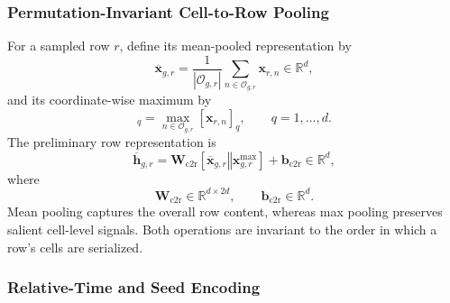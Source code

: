 \documentclass[11pt]{article}
\newcommand{\R}{\mathbb{R}}
\newcommand{\concat}{\mathbin{\Vert}}
\begin{document}
\subsubsection{Permutation-Invariant Cell-to-Row Pooling}
\label{sec:row-pooling}

For a sampled row \(r\), define its mean-pooled representation by
\begin{equation}
    \overline{\mathbf x}_{g,r}
    =
    \frac{1}{|\mathcal O_{g,r}|}
    \sum_{n\in\mathcal O_{g,r}}
    \mathbf x_{r,n}
    \in\R^d,
    \label{eq:mean-pool}
\end{equation}
and its coordinate-wise maximum by
\begin{equation}
    [\mathbf x_{g,r}^{\max}]_q
    =
    \max_{n\in\mathcal O_{g,r}}
    [\mathbf x_{r,n}]_q,
    \qquad
    q=1,\ldots,d.
    \label{eq:max-pool}
\end{equation}
The preliminary row representation is
\begin{equation}
    \boxed{
    \overline{\mathbf h}_{g,r}
    =
    \mathbf W_{\mathrm{c2r}}
    \left[
        \overline{\mathbf x}_{g,r}
        \concat
        \mathbf x_{g,r}^{\max}
    \right]
    +
    \mathbf b_{\mathrm{c2r}}
    }
    \in\R^d,
    \label{eq:cell-to-row}
\end{equation}
where
\begin{equation}
    \mathbf W_{\mathrm{c2r}}
    \in\R^{d\times2d},
    \qquad
    \mathbf b_{\mathrm{c2r}}
    \in\R^d.
    \label{eq:c2r-domains}
\end{equation}
Mean pooling captures the overall row content, whereas max pooling preserves
salient cell-level signals.  Both operations are invariant to the order in
which a row's cells are serialized.

\subsubsection{Relative-Time and Seed Encoding}
\label{sec:time-seed-encoding}
\end{document}
